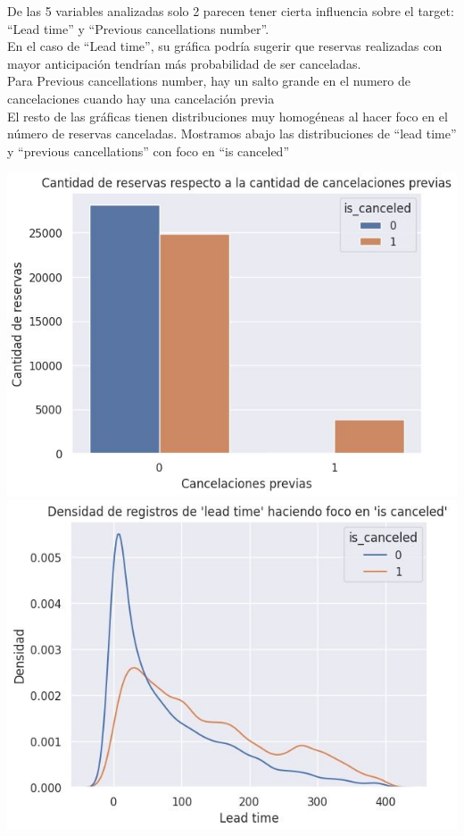 \documentclass{article}
\begin{document}
De las 5 variables analizadas solo 2 parecen tener cierta influencia sobre el target: ``Lead time'' y ``Previous cancellations number''. \\
En el caso de ``Lead time'', su gráfica podría sugerir que reservas realizadas con mayor anticipación tendrían más probabilidad de ser canceladas.\\
Para Previous cancellations number, hay un salto grande en el numero de cancelaciones cuando hay una cancelación previa\\
El resto de las gráficas tienen distribuciones muy homogéneas al hacer foco en el número de reservas canceladas. 
Mostramos abajo las distribuciones de ``lead time'' y ``previous cancellations'' con foco en ``is canceled''

\includegraphics[scale=0.4]{previous_cancellations_num}
    \hspace{2.2cm}
\includegraphics[scale=0.4]{lead_time}
\end{document}
